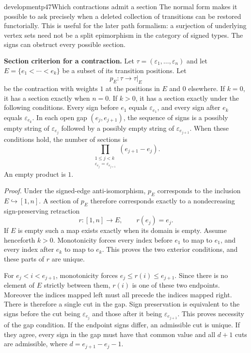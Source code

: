\begin{dcomment}{development}{p47}{Which contractions admit a section}
The normal form makes it possible to ask precisely when a deleted collection of transitions can be restored functorially. This is useful for the later path formalism: a surjection of underlying vertex sets need not be a split epimorphism in the category of signed types. The signs can obstruct every possible section.

\textbf{Section criterion for a contraction.}\ours{}
Let $\tau=(\varepsilon_1,\ldots,\varepsilon_n)$ and let $E=\{e_1<\cdots<e_k\}$ be a subset of its transition positions. Let
\[
 p_E:\tau\longrightarrow\tau|_E
\]
be the contraction with weights $1$ at the positions in $E$ and $0$ elsewhere. If $k=0$, it has a section exactly when $n=0$. If $k>0$, it has a section exactly under the following conditions. Every sign before $e_1$ equals $\varepsilon_{e_1}$, and every sign after $e_k$ equals $\varepsilon_{e_k}$. In each open gap $(e_j,e_{j+1})$, the sequence of signs is a possibly empty string of $\varepsilon_{e_j}$ followed by a possibly empty string of $\varepsilon_{e_{j+1}}$. When these conditions hold, the number of sections is
\[
 \prod_{\substack{1\leq j<k\\
                  \varepsilon_{e_j}=\varepsilon_{e_{j+1}}}}
       (e_{j+1}-e_j).
\]
An empty product is $1$.

\emph{Proof.} Under the signed-edge anti-isomorphism, $p_E$ corresponds to the inclusion $E\hookrightarrow[1,n]$. A section of $p_E$ therefore corresponds exactly to a nondecreasing sign-preserving retraction
\[
 r:[1,n]\longrightarrow E,\qquad r(e_j)=e_j.
\]
If $E$ is empty such a map exists exactly when its domain is empty. Assume henceforth $k>0$. Monotonicity forces every index before $e_1$ to map to $e_1$, and every index after $e_k$ to map to $e_k$. This proves the two exterior conditions, and these parts of $r$ are unique.

For $e_j<i<e_{j+1}$, monotonicity forces
$e_j\leq r(i)\leq e_{j+1}$. Since there is no element of $E$ strictly between them, $r(i)$ is one of these two endpoints. Moreover the indices mapped left must all precede the indices mapped right. There is therefore a single cut in the gap. Sign preservation is equivalent to the signs before the cut being $\varepsilon_{e_j}$ and those after it being $\varepsilon_{e_{j+1}}$. This proves necessity of the gap condition. If the endpoint signs differ, an admissible cut is unique. If they agree, every sign in the gap must have that common value and all $d+1$ cuts are admissible, where $d=e_{j+1}-e_j-1$.


\end{dcomment}
